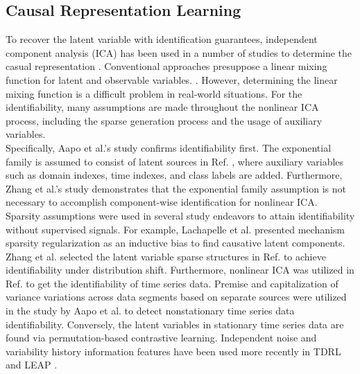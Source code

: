 \subsection{Causal Representation Learning}
To recover the latent variable with identification guarantees\cite{yao2023multi,scholkopf2021toward,liu2023causal,gresele2020incomplete}, independent component analysis (ICA) has been used in a number of studies to determine the casual representation \cite{rajendran2024learning,mansouri2023object,wendong2024causal}. 
Conventional approaches presuppose a linear mixing function for latent and observable variables. \cite{comon1994independent,hyvarinen2013independent,lee1998independent,zhang2007kernel}. However, determining the linear mixing function is a difficult problem in real-world situations. For the identifiability, many assumptions are made throughout the nonlinear ICA process, including the sparse generation process and the usage of auxiliary variables\cite{zheng2022identifiability,hyvarinen1999nonlinear,hyvarinen2024identifiability,khemakhem2020ice,li2023identifying}.\\
Specifically, Aapo et al.'s study confirms identifiability first. The exponential family is assumed to consist of latent sources in Ref. \cite{khemakhem2020variational,hyvarinen2016unsupervised,hyvarinen2017nonlinear, hyvarinen2019nonlinear}, where auxiliary variables such as domain indexes, time indexes, and class labels are added. Furthermore, Zhang et al.'s study \cite{kong2022partial, xie2023multi,kong2023identification,yan2024counterfactual} demonstrates that the exponential family assumption is not necessary to accomplish component-wise identification for nonlinear ICA. \\
Sparsity assumptions were used in several study endeavors to attain identifiability without supervised signals\cite{zheng2022identifiability,hyvarinen1999nonlinear,hyvarinen2024identifiability,khemakhem2020ice,li2023identifying}. For example, Lachapelle et al. \cite{lachapelle2023synergies, lachapelle2022partial} presented mechanism sparsity regularization as an inductive bias to find causative latent components. Zhang et al. selected the latent variable sparse structures in Ref. \cite{zhang2024causal} to achieve identifiability under distribution shift. Furthermore, nonlinear ICA was utilized in Ref. \cite{hyvarinen2016unsupervised,yan2024counterfactual,huang2023latent,halva2020hidden,lippe2022citris} to get the identifiability of time series data. 
Premise and capitalization of variance variations across data segments based on separate sources were utilized in the study by Aapo et al.\cite{hyvarinen2016unsupervised} to detect nonstationary time series data identifiability. Conversely, the latent variables in stationary time series data are found via permutation-based contrastive learning. Independent noise and variability history information features have been used more recently in TDRL \cite{yao2022temporally} and LEAP \cite{yao2021learning}. \\
